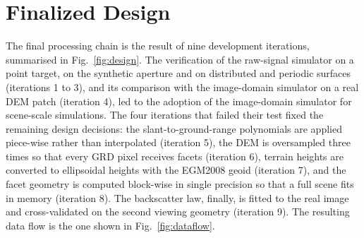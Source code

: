 \section{Finalized Design}
\label{sec:final-design}
The final processing chain is the result of nine development iterations, summarised in Fig.~\ref{fig:design}. The
verification of the raw-signal simulator on a point target, on the synthetic aperture and on distributed and periodic
surfaces (iterations 1 to 3), and its comparison with the image-domain simulator on a real DEM patch (iteration 4), led
to the adoption of the image-domain simulator for scene-scale simulations. The four iterations that failed their test
fixed the remaining design decisions: the slant-to-ground-range polynomials are applied piece-wise rather than
interpolated (iteration 5), the DEM is oversampled three times so that every GRD pixel receives facets (iteration 6),
terrain heights are converted to ellipsoidal heights with the EGM2008 geoid (iteration 7), and the facet geometry is
computed block-wise in single precision so that a full scene fits in memory (iteration 8). The backscatter law,
finally, is fitted to the real image and cross-validated on the second viewing geometry (iteration 9). The resulting
data flow is the one shown in Fig.~\ref{fig:dataflow}.
